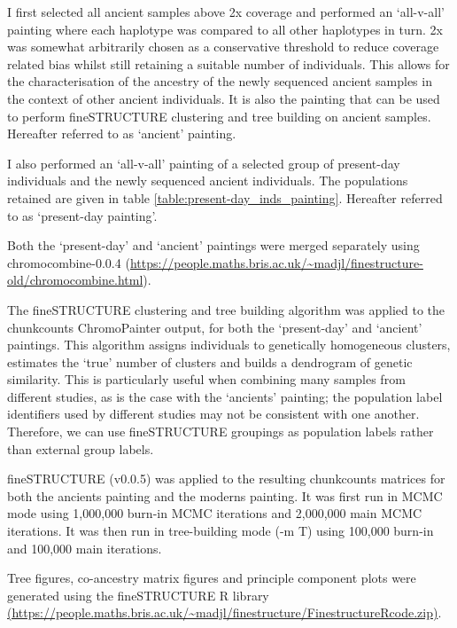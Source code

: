 I first selected all ancient samples above 2x coverage and performed an `all-v-all' painting where each haplotype was compared to all other haplotypes in turn. 2x was somewhat arbitrarily chosen as a conservative threshold to reduce coverage related bias whilst still retaining a suitable number of individuals. This allows for the characterisation of the ancestry of the newly sequenced ancient samples in the context of other ancient individuals. It is also the painting that can be used to perform fineSTRUCTURE clustering and tree building on ancient samples. Hereafter referred to as `ancient' painting.

I also performed an `all-v-all' painting of a selected group of present-day individuals and the newly sequenced ancient individuals. The populations retained are given in table \ref{table:present-day_inds_painting}. Hereafter referred to as `present-day painting'.

Both the `present-day' and `ancient' paintings were merged separately using chromocombine-0.0.4 (\url{https://people.maths.bris.ac.uk/~madjl/finestructure-old/chromocombine.html}). 

The fineSTRUCTURE \cite{Lawson2012} clustering and tree building algorithm was applied to the chunkcounts ChromoPainter output, for both the `present-day' and `ancient' paintings. This algorithm assigns individuals to genetically homogeneous clusters, estimates the `true' number of clusters and builds a dendrogram of genetic similarity. This is particularly useful when combining many samples from different studies, as is the case with the `ancients' painting; the population label identifiers used by different studies may not be consistent with one another. Therefore, we can use fineSTRUCTURE groupings as population labels rather than external group labels. 

fineSTRUCTURE (v0.0.5) was applied to the resulting chunkcounts matrices for both the ancients painting and the moderns painting. It was first run in MCMC mode using 1,000,000 burn-in MCMC iterations and 2,000,000 main MCMC iterations. It was then run in tree-building mode (-m T) using 100,000 burn-in and 100,000 main iterations. 

Tree figures, co-ancestry matrix figures and principle component plots were generated using the fineSTRUCTURE R library \url{(https://people.maths.bris.ac.uk/~madjl/finestructure/FinestructureRcode.zip)}.

